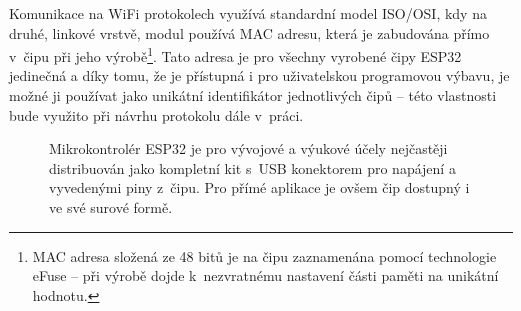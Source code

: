 Komunikace na WiFi protokolech využívá standardní model ISO/OSI, kdy na druhé, linkové vrstvě, modul používá MAC
adresu, která je zabudována přímo v~čipu při jeho výrobě\footnote{MAC adresa složená ze 48 bitů je na čipu
zaznamenána pomocí technologie eFuse -- při výrobě dojde k~nezvratnému nastavení části paměti na unikátní hodnotu.}.
Tato adresa je pro všechny vyrobené čipy ESP32 jedinečná a díky tomu, že je přístupná i pro uživatelskou programovou
výbavu, je možné ji používat jako unikátní identifikátor jednotlivých čipů -- této vlastnosti bude využito při návrhu
protokolu dále v~práci.

\begin{figure}
    \centering
    \quad%

    \caption{Mikrokontrolér ESP32 je pro vývojové a výukové účely nejčastěji distribuován jako kompletní kit s~USB
    konektorem pro napájení a vyvedenými piny z~čipu. %
    Pro přímé aplikace je ovšem čip dostupný i ve své surové formě.}
    \label{fig:esp32}
\end{figure}

\addtocounter{footnote}{-1}

